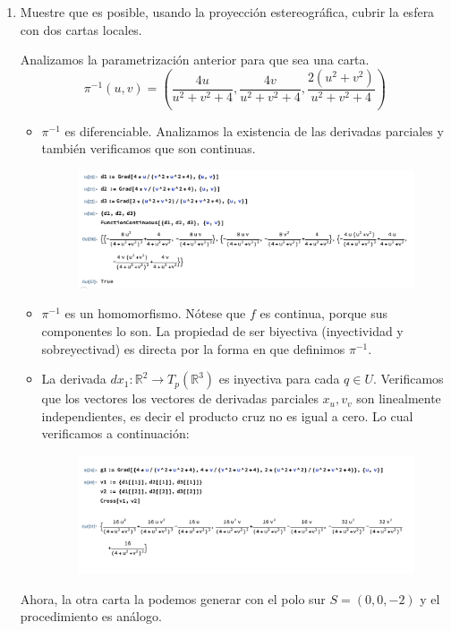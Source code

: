 \begin{problema}
\begin{enumerate}
\begin{sol}
\end{sol}

        \item Muestre que es posible, usando la proyección estereográfica, cubrir la esfera con dos cartas locales.
        \begin{sol}
            Analizamos la parametrización anterior para que sea una carta.
            $$\pi^{-1}(u,v)=\left(\frac{4u}{u^2+v^2+4}, \frac{4v}{u^2+v^2+4}, \frac{2(u^2+v^2)}{u^2+v^2+4}\right)$$
            \begin{itemize}
                \item $\pi^{-1}$ es diferenciable. Analizamos la existencia de las derivadas parciales y también verificamos que son continuas. 
                \begin{figure}[H]
                    \centering 
                    \includegraphics[scale=0.5]{imagenes/8.png}
                \end{figure}

                \item $\pi^{-1}$ es un homomorfismo. Nótese que $f$ es continua, porque sus componentes lo son. La propiedad de ser biyectiva (inyectividad y sobreyectivad) es directa por la forma en que definimos $\pi^{-1}$. 
                \item La derivada $dx_1:\mathbb{R}^2\to T_p(\mathbb{R}^3)$ es inyectiva para cada $q\in U$. Verificamos que los vectores los vectores de derivadas parciales $x_u,v_v$ son linealmente independientes, es decir el producto cruz no es igual a cero. Lo cual verificamos a continuación: 
                \begin{figure}[H]
                    \centering 
                    \includegraphics[scale=0.5]{imagenes/9.png}
                \end{figure}
            \end{itemize}
            
            Ahora, la otra carta la podemos generar con el polo sur $S=(0,0,-2)$ y el procedimiento es análogo. 
        \end{sol}
    \end{enumerate}

\end{problema}

